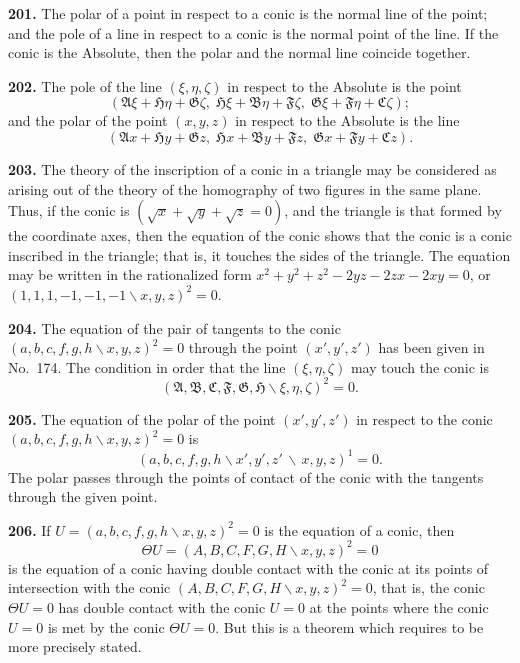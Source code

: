 \documentclass[11pt,a4paper]{article}
\begin{document}
\textbf{201.} The polar of a point in respect to a conic is the normal line of the point;
and the pole of a line in respect to a conic is the normal point of the line. If the conic
is the Absolute, then the polar and the normal line coincide together.

\textbf{202.} The pole of the line $(\xi,\eta,\zeta)$ in respect to the Absolute is the point
\[
(\mathfrak{A}\xi+\mathfrak{H}\eta+\mathfrak{G}\zeta,\; \mathfrak{H}\xi+\mathfrak{B}\eta+\mathfrak{F}\zeta,\; \mathfrak{G}\xi+\mathfrak{F}\eta+\mathfrak{C}\zeta);
\]
and the polar of the point $(x,y,z)$ in respect to the Absolute is the line
\[
(\mathfrak{A}x+\mathfrak{H}y+\mathfrak{G}z,\; \mathfrak{H}x+\mathfrak{B}y+\mathfrak{F}z,\; \mathfrak{G}x+\mathfrak{F}y+\mathfrak{C}z).
\]

\textbf{203.} The theory of the inscription of a conic in a triangle may be considered
as arising out of the theory of the homography of two figures in the same plane.
Thus, if the conic is $(\sqrt{x}+\sqrt{y}+\sqrt{z}=0)$, and the triangle is that formed by the
coordinate axes, then the equation of the conic shows that the conic is a conic
inscribed in the triangle; that is, it touches the sides of the triangle. The equation
may be written in the rationalized form $x^2+y^2+z^2-2yz-2zx-2xy=0$, or
$(1,1,1,-1,-1,-1\!\backslash x,y,z)^2=0$.

\textbf{204.} The equation of the pair of tangents to the conic $(a,b,c,f,g,h\!\backslash x,y,z)^2=0$
through the point $(x',y',z')$ has been given in No.~174. The condition in order
that the line $(\xi,\eta,\zeta)$ may touch the conic is
\[
(\mathfrak{A},\mathfrak{B},\mathfrak{C},\mathfrak{F},\mathfrak{G},\mathfrak{H}\!\backslash \xi,\eta,\zeta)^2 = 0.
\]

\textbf{205.} The equation of the polar of the point $(x',y',z')$ in respect to the conic
$(a,b,c,f,g,h\!\backslash x,y,z)^2=0$ is
\[
(a,b,c,f,g,h\!\backslash x',y',z'\,\backslash\,x,y,z)^1 = 0.
\]
The polar passes through the points of contact of the conic with the tangents through
the given point.

\textbf{206.} If $U=(a,b,c,f,g,h\!\backslash x,y,z)^2=0$ is the equation of a conic, then
\[
\Theta U = (A,B,C,F,G,H\!\backslash x,y,z)^2 = 0
\]
is the equation of a conic having double contact with the conic at its points
of intersection with the conic $(A,B,C,F,G,H\!\backslash x,y,z)^2=0$, that is, the conic $\Theta U=0$
has double contact with the conic $U=0$ at the points where the conic $U=0$ is met
by the conic $\Theta U=0$. But this is a theorem which requires to be more precisely
stated.
\end{document}
